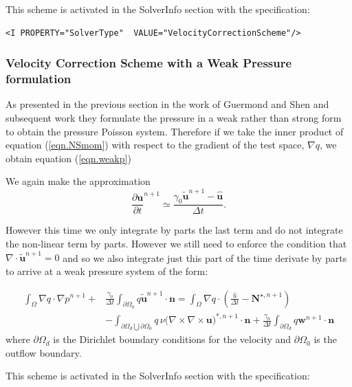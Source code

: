 This scheme is activated in the SolverInfo section with the
 specification:

\begin{lstlisting}[style=XMLStyle]
 <I PROPERTY="SolverType"  VALUE="VelocityCorrectionScheme"/>
\end{lstlisting}


\subsubsection{Velocity Correction Scheme with a Weak Pressure formulation}

As presented in the previous section in the work of Guermond and Shen
\cite{SuSh03} and subsequent work they formulate the pressure in a
weak rather than strong form to obtain the pressure Poisson
system. Therefore if we take the inner product of equation
(\ref{eqn.NSmom}) with respect to the gradient of the test space,
$\nabla q$, we obtain equation (\ref{eqn.weakp})

We again make the approximation 
\begin{equation}
  \frac{\partial \mathbf{u}}{\partial t}^{n+1} \simeq \frac{\gamma_0 \tilde{\mathbf{u}}^{n+1} - \hat{\mathbf{u}}}{\Delta t}.
\end{equation}

However this time we only integrate by parts the last term and do not
integrate the non-linear term by parts. However we still need to
enforce the condition that $\nabla \cdot \tilde{\mathbf{u}}^{n+1} = 0
$ and so we also integrate just this part of the time derivate by
parts to arrive at a weak pressure system of the form:

\begin{align}
  \int_{\Omega} \nabla q \cdot \nabla p^{n+1} +& \frac{\gamma_0}{\Delta t} \int_{\partial \Omega_0} q { \tilde{\mathbf{u}}}^{n+1} \cdot \mathbf{n}  = 
  \int_{\Omega} \nabla q \cdot (\frac{\hat{u}}{\Delta t}
   - {\mathbf{N}}^{\star,n+1})  \nonumber \\
  & - \int_{\partial \Omega_d \bigcup \partial \Omega_0} q\, \nu (\nabla \times \nabla \times {\mathbf{u})}^{*,n+1} \cdot \mathbf{n} + \frac{\gamma_0}{\Delta t} \int_{\partial \Omega_d} q {\mathbf{w}}^{n+1} \cdot \mathbf{n}
\end{align}
where $\partial \Omega_d$ is the Dirichlet boundary conditions for the velocity and $\partial \Omega_0$ is the outflow boundary. 

This scheme is activated in the SolverInfo section with the
 specification:

